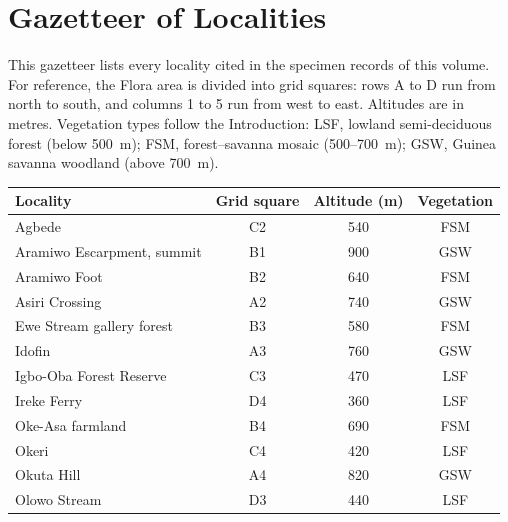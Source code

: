 \chapter{Gazetteer of Localities}
\label{app:gazetteer}

This gazetteer lists every locality cited in the specimen records of
this volume. For reference, the Flora area is divided into grid
squares: rows A to D run from north to south, and columns 1 to 5 run
from west to east. Altitudes are in metres. Vegetation types follow
the Introduction: LSF, lowland semi-deciduous forest (below 500~m);
FSM, forest--savanna mosaic (500--700~m); GSW, Guinea savanna woodland
(above 700~m).

\begin{longtable}{@{}p{}ccc@{}}
	\toprule
	Locality & Grid square & Altitude (m) & Vegetation \\
	\midrule
	\endhead
	\bottomrule
	\endfoot
	Agbede                       & C2 & 540 & FSM \\
	Aramiwo Escarpment, summit   & B1 & 900 & GSW \\
	Aramiwo Foot                 & B2 & 640 & FSM \\
	Asiri Crossing               & A2 & 740 & GSW \\
	Ewe Stream gallery forest    & B3 & 580 & FSM \\
	Idofin                       & A3 & 760 & GSW \\
	Igbo-Oba Forest Reserve      & C3 & 470 & LSF \\
	Ireke Ferry                  & D4 & 360 & LSF \\
	Oke-Asa farmland             & B4 & 690 & FSM \\
	Okeri                        & C4 & 420 & LSF \\
	Okuta Hill                   & A4 & 820 & GSW \\
	Olowo Stream                 & D3 & 440 & LSF \\
\end{longtable}